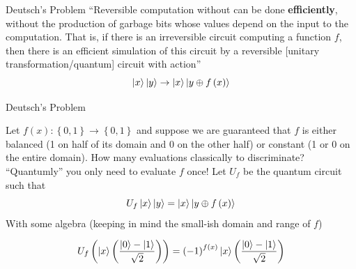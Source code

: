 \documentclass{beamer}
\begin{document}



\begin{frame}{Deutsch's Problem}
``Reversible computation without can be done \textbf{efficiently}, without the production of garbage bits whose values depend on the input to the computation. That is, if there is an irreversible circuit computing a function $f$, then there is an efficient simulation of this circuit by a reversible [unitary transformation/quantum] circuit with action''\cite{Nielsen:2011:QCQ:1972505}
\[
\Ket{x}\Ket{y}\to\Ket{x}\Ket{y\oplus f\left(x\right)}
\]

\end{frame}


\begin{frame}{Deutsch's Problem}

Let $f\left(x\right):\left\{ 0,1\right\} \to\left\{ 0,1\right\}$ and suppose we are guaranteed that $f$ is either balanced (1 on half of its domain and 0 on the other half)
or constant (1 or 0 on the entire domain). How many evaluations classically to discriminate? ``Quantumly'' you only need
to evaluate $f$ once! Let $U_f$ be the quantum circuit such that 
\[
U_f\Ket{x}\Ket{y}=\Ket{x}\Ket{y\oplus f\left(x\right)}
\]
With some algebra (keeping in mind the small-ish domain and range of $f$)

\[
U_{f}\left(\Ket{x}\left(\frac{\Ket{0}-\Ket{1}}{\sqrt{2}}\right)\right)=\left(-1\right)^{f\left(x\right)}\Ket{x}\left(\frac{\Ket{0}-\Ket{1}}{\sqrt{2}}\right)
\]
\end{frame}
\end{document}
